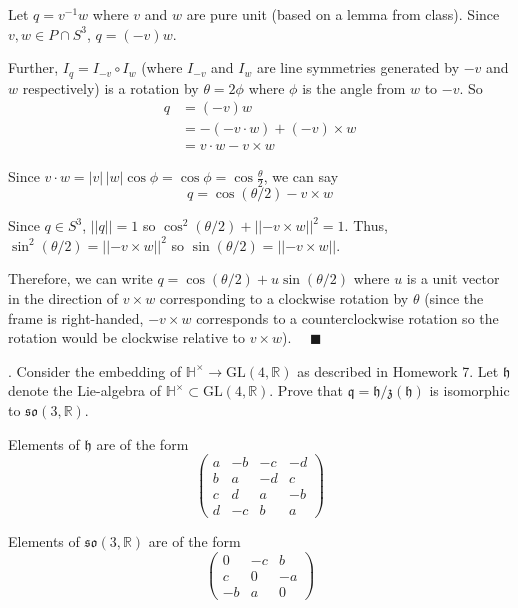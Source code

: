 \documentclass[12pt]{article}
\newcommand{\R}{\mathbb{R}}
\newcommand{\GL}{\text{GL}}
\newcommand{\lra}{\longrightarrow}
\newcommand{\h}{\mathfrak{h}}
\newcommand{\Ha}{\mathbb{H}}
\newcommand{\abs}[1]{\left\vert #1 \right\vert}
\newcommand{\norm}[1]{\left\vert \left\vert #1 \right\vert \right\vert}
\newcommand{\qed}{\quad \blacksquare}
\begin{document}
    \color{blue}
        Let $q = v^{-1}w$ where $v$ and $w$ are pure unit (based on a lemma from class). Since $v, w \in P \cap S^3$, $q = (-v)w$. 

        Further, $I_q = I_{-v} \circ I_w$ (where $I_{-v}$ and $I_w$ are line symmetries generated by $-v$ and $w$ respectively) is a rotation by $\theta = 2\phi$ where $\phi$ is the angle from $w$ to $-v$. So 
        \begin{align*}
            q &= (-v)w\\ 
            &= -(-v \cdot w) + (-v) \times w\\ 
            &= v \cdot w - v \times w
        \end{align*}

        Since $v \cdot w = \abs{v}\, \abs{w} \cos \phi = \cos \phi = \cos \frac{\theta}{2}$, we can say 
        \[q = \cos(\theta/2) - v\times w\]
      
        Since $q \in S^3$, $\norm{q} = 1$ so $\cos^2(\theta/2) + \norm{-v \times w}^2 = 1$. Thus, $\sin^2(\theta/2) = \norm{-v \times w}^2$ so $\sin(\theta/2) = \norm{-v \times w}$.

        Therefore, we can write $q = \cos(\theta/2) + u\sin(\theta/2)$ where $u$ is a unit vector in the direction of $v \times w$ corresponding to a clockwise rotation by $\theta$ (since the frame is right-handed, $-v \times w$ corresponds to a counterclockwise rotation so the rotation would be clockwise relative to $v \times w$). $\qed$
    \color{black}


.  Consider the embedding of $\Ha^{\times} \lra \GL(4,\R)$ as described in Homework 7.  Let $\h$ denote the Lie-algebra of $\Ha^{\times} \subset \GL(4,\R)$.  Prove that $\mathfrak{q} = \h/\mathfrak{z}(\h)$ is isomorphic to $\mathfrak{so}(3,\R)$.  

    \color{blue}
        Elements of $\h$ are of the form 
        \[\begin{pmatrix}
            a & -b & -c & -d\\
            b & a & -d & c\\
            c & d & a & -b\\
            d & -c & b & a
        \end{pmatrix}\]

        Elements of $\mathfrak{so}(3, \R)$ are of the form 
        \[\begin{pmatrix}
            0 & -c & b\\
            c & 0 & -a\\
            -b & a & 0
        \end{pmatrix}\]
\end{document}
